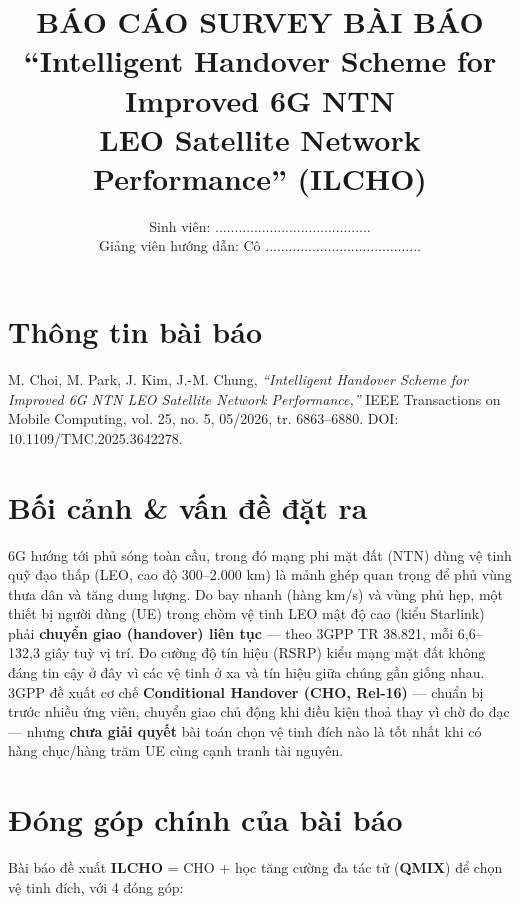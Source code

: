 \documentclass[12pt,a4paper]{article}
\title{\textbf{BÁO CÁO SURVEY BÀI BÁO}\\[4pt]
\large ``Intelligent Handover Scheme for Improved 6G NTN\\
LEO Satellite Network Performance'' (ILCHO)}
\author{Sinh viên: ........................................\\
Giảng viên hướng dẫn: Cô ........................................}
\date{}
\begin{document}
\maketitle
\vspace{-2em}

\section{Thông tin bài báo}

M. Choi, M. Park, J. Kim, J.-M. Chung, \emph{``Intelligent Handover Scheme for Improved 6G
NTN LEO Satellite Network Performance,''} IEEE Transactions on Mobile Computing, vol. 25,
no. 5, 05/2026, tr. 6863--6880. DOI: 10.1109/TMC.2025.3642278.

\section{Bối cảnh \& vấn đề đặt ra}

6G hướng tới phủ sóng toàn cầu, trong đó mạng phi mặt đất (NTN) dùng vệ tinh quỹ đạo thấp
(LEO, cao độ 300--2.000 km) là mảnh ghép quan trọng để phủ vùng thưa dân và tăng dung lượng.
Do bay nhanh (hàng km/s) và vùng phủ hẹp, một thiết bị người dùng (UE) trong chòm vệ tinh
LEO mật độ cao (kiểu Starlink) phải \textbf{chuyển giao (handover) liên tục} — theo 3GPP TR
38.821, mỗi 6,6--132,3 giây tuỳ vị trí. Đo cường độ tín hiệu (RSRP) kiểu mạng mặt đất không
đáng tin cậy ở đây vì các vệ tinh ở xa và tín hiệu giữa chúng gần giống nhau. 3GPP đề xuất cơ
chế \textbf{Conditional Handover (CHO, Rel-16)} — chuẩn bị trước nhiều ứng viên, chuyển giao
chủ động khi điều kiện thoả thay vì chờ đo đạc — nhưng \textbf{chưa giải quyết} bài toán chọn
vệ tinh đích nào là tốt nhất khi có hàng chục/hàng trăm UE cùng cạnh tranh tài nguyên.

\section{Đóng góp chính của bài báo}

Bài báo đề xuất \textbf{ILCHO} = CHO + học tăng cường đa tác tử (\textbf{QMIX}) để chọn vệ
tinh đích, với 4 đóng góp:
\end{document}
